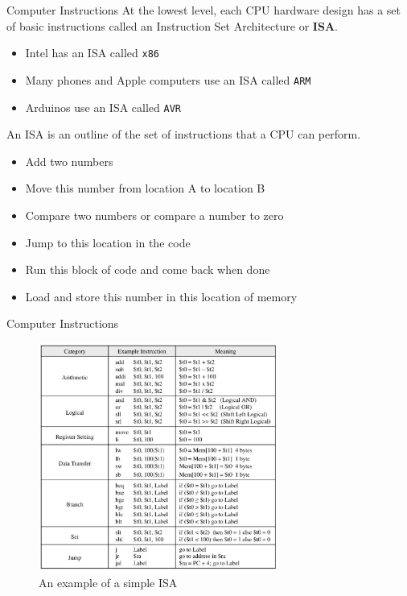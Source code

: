 \documentclass[]{beamer}
\begin{document}
\begin{frame}{Computer Instructions}
    At the lowest level, each CPU hardware design has a set of basic instructions called an Instruction Set Architecture or \textbf{ISA}.
    
    \begin{itemize}
        \item Intel has an ISA called \texttt{x86}
        \item Many phones and Apple computers use an ISA called \texttt{ARM}
        \item Arduinos use an ISA called \texttt{AVR}
    \end{itemize}
    
    An ISA is an outline of the set of instructions that a CPU can perform.
    \begin{itemize}
        \item Add two numbers
        \item Move this number from location A to location B
        \item Compare two numbers or compare a number to zero
        \item Jump to this location in the code
        \item Run this block of code and come back when done
        \item Load and store this number in this location of memory
    \end{itemize}

\end{frame}

\begin{frame}{Computer Instructions}
    \begin{figure}
        \centering
        \includegraphics[width=0.7\textwidth]{imgs/vis_6.png}
        \\
        An example of a simple ISA
    \end{figure}
\end{frame}
\end{document}
